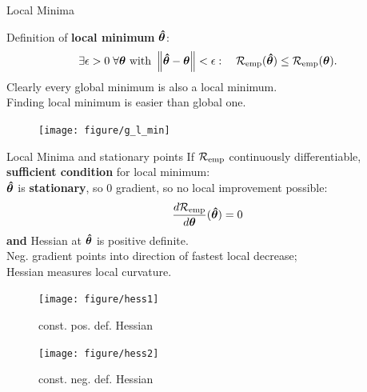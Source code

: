 \documentclass[11pt,compress,t,notes=noshow, xcolor=table]{beamer}
\begin{document}
\begin{vbframe}{Local Minima}

Definition of \textbf{local minimum} $\bm{\hat\theta}$:
\[
\exists \epsilon > 0\; \forall \bm{\theta} \text{ with } \left\Vert\bm{\hat\theta} - \bm{\theta}\right\Vert < \epsilon: \quad \mathcal{R}_{\text{emp}}(\bm{\hat\theta}) \leq \mathcal{R}_{\text{emp}}(\bm{\theta}) .
\]
Clearly every global minimum is also a local minimum.\\

Finding local minimum is easier than global one.

\vfill

\begin{center}
\begin{figure}[!b]
\texttt{[image: figure/g\_l\_min]}
\end{figure}
\end{center}

\end{vbframe}
\begin{vbframe}{Local Minima and stationary points}
\footnotesize
If $\mathcal{R}_{\text{emp}}$ continuously differentiable, \textbf{sufficient condition} for local minimum: \\
$\bm{\hat\theta}$ is \textbf{stationary}, so 0 gradient, so no local improvement possible:
\[
\frac{d \mathcal{R}_{\text{emp}}}{d\bm{\theta}}(\bm{\hat\theta}) = 0
\]
\textbf{and} Hessian at $\bm{\hat\theta}$ is positive definite. \\

Neg. gradient points into direction of fastest local decrease;\\
Hessian measures local curvature.

\begin{figure}[!htb]
{
  \texttt{[image: figure/hess1]}
  \caption*{\footnotesize const. pos. def. Hessian}
}
{
  \texttt{[image: figure/hess2]}
  \caption*{\footnotesize const. neg. def. Hessian}
}
\end{figure}

\end{vbframe}

\end{document}
